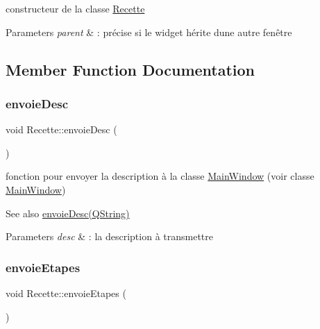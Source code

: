 constructeur de la classe \hyperlink{classRecette}{Recette} 


\begin{DoxyParams}{Parameters}
{\em parent} & \+: précise si le widget hérite d\textquotesingle{}une autre fenêtre \\
\hline
\end{DoxyParams}


\subsection{Member Function Documentation}
\mbox{\label{classRecette_a4871cd68f067b53e882eb2389c11c763}} 
\subsubsection{\texorpdfstring{envoie\+Desc}{envoieDesc}}
{\footnotesize\ttfamily void Recette\+::envoie\+Desc (\begin{DoxyParamCaption}\item[{Q\+String}]{ }\end{DoxyParamCaption})\hspace{0.3cm}{\ttfamily [signal]}}



fonction pour envoyer la description à la classe \hyperlink{classMainWindow}{Main\+Window} (voir classe \hyperlink{classMainWindow}{Main\+Window}) 

\begin{DoxySeeAlso}{See also}
\hyperlink{classRecette_a4871cd68f067b53e882eb2389c11c763}{envoie\+Desc(\+Q\+String)} 
\end{DoxySeeAlso}

\begin{DoxyParams}{Parameters}
{\em desc} & \+: la description à transmettre \\
\hline
\end{DoxyParams}
\mbox{\label{classRecette_ab8af419707ae263fb7b273988b81bd6e}} 
\subsubsection{\texorpdfstring{envoie\+Etapes}{envoieEtapes}}
{\footnotesize\ttfamily void Recette\+::envoie\+Etapes (\begin{DoxyParamCaption}\item[{Q\+String\+List}]{ }\end{DoxyParamCaption})\hspace{0.3cm}{\ttfamily [signal]}}



